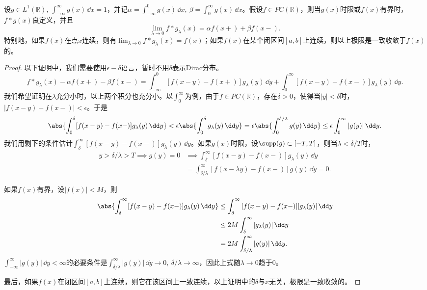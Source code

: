 \begin{theorem}
    设$g\in L^1(\mathbb{R}),\ \int_{-\infty}^{\infty}g(x)\,\dd x=1$，并记$\alpha=\int_{-\infty}^{0}g(x)\,\dd x,\ \beta=\int_{0}^{\infty}g(x)\,\dd x$。假设$f\in PC(\mathbb{R})$，则当$g(x)$时限或$f(x)$有界时，$f*g(x)$良定义，并且
    \begin{equation}
        \lim_{\lambda\to 0}f*g_\lambda(x)=\alpha f(x+)+\beta f(x-).
    \end{equation}
    特别地，如果$f(x)$在点$x$连续，则有$\lim_{\lambda\to 0}f*g_\lambda(x)=f(x)$；如果$f(x)$在某个闭区间$[a,b]$上连续，则以上极限是一致收敛于$f(x)$的。
\end{theorem}
\begin{proof}
    以下证明中，我们需要使用$\epsilon-\delta$语言，暂时不用$\delta$表示Dirac分布。
    \begin{equation}
        f*g_\lambda(x)-\alpha f(x+)-\beta f(x-)=\int_{-\infty}^{0}[f(x-y)-f(x+)]g_\lambda(y)\,\dd y+\int_{0}^{\infty}[f(x-y)-f(x-)]g_\lambda(y)\,\dd y.
    \end{equation}
    我们希望证明在$\lambda$充分小时，以上两个积分也充分小。以$\int_{0}^{\infty}$为例，由于$f\in PC(\mathbb{R})$，存在$\delta>0$，使得当$|y|<\delta$时，$|f(x-y)-f(x-)|<\epsilon$。于是
    \begin{equation}
        \abs{\int_{0}^{\delta}[f(x-y)-f(x-)]g_\lambda(y)\,\dd y}<\epsilon\abs{\int_{0}^{\delta}g_\lambda(y)\,\dd y}=\epsilon\abs{\int_{0}^{\delta/\lambda}g(y)\,\dd y}\leq\epsilon\int_{0}^{\infty}|g(y)|\,\dd y.
    \end{equation}
    我们用剩下的条件估计$\int_{\delta}^{\infty}[f(x-y)-f(x-)]g_\lambda(y)\,\dd y$。如果$g(x)$时限，设$\supp(g)\subset[-T,T]$，则当$\lambda<\delta/T$时，
    \begin{align}
        y>\delta/\lambda>T\implies g(y)=0&\implies\int_{\delta}^{\infty}[f(x-y)-f(x-)]g_\lambda(y)\,\dd y \nonumber \\
        &=\int_{\delta/\lambda}^{\infty}[f(x-\lambda y)-f(x-)]g(y)\,\dd y=0.
    \end{align}

    如果$f(x)$有界，设$|f(x)|<M$，则
    \begin{align}
        \abs{\int_{\delta}^{\infty}[f(x-y)-f(x-)]g_\lambda(y)\,\dd y}&\leq \int_{\delta}^{\infty}|f(x-y)-f(x-)||g_\lambda(y)|\,\dd y \nonumber \\
        &\leq 2M\int_{\delta}^{\infty}|g_\lambda(y)|\,\dd y \nonumber \\
        &=2M\int_{\delta/\lambda}^{\infty}|g(y)|\,\dd y.
    \end{align}
    $\int_{-\infty}^{\infty}|g(y)|\,\dd y<\infty$的必要条件是$\int_{\delta/\lambda}^{\infty}|g(y)|\,\dd y\to 0,\ \delta/\lambda\to\infty$，因此上式随$\lambda\to 0$趋于$0$。

    最后，如果$f(x)$在闭区间$[a,b]$上连续，则它在该区间上一致连续，以上证明中的$\delta$与$x$无关，极限是一致收敛的。
\end{proof}
